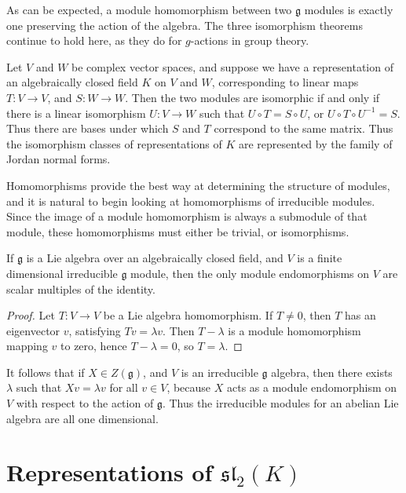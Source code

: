 As can be expected, a module homomorphism between two $\mathfrak{g}$ modules is exactly one preserving the action of the algebra. The three isomorphism theorems continue to hold here, as they do for $g$-actions in group theory.

\begin{example}
    Let $V$ and $W$ be complex vector spaces, and suppose we have a representation of an algebraically closed field $K$ on $V$ and $W$, corresponding to linear maps $T: V \to V$, and $S: W \to W$. Then the two modules are isomorphic if and only if there is a linear isomorphism $U: V \to W$ such that $U \circ T = S \circ U$, or $U \circ T \circ U^{-1} = S$. Thus there are bases under which $S$ and $T$ correspond to the same matrix. Thus the isomorphism classes of representations of $K$ are represented by the family of Jordan normal forms.
\end{example}

Homomorphisms provide the best way at determining the structure of modules, and it is natural to begin looking at homomorphisms of irreducible modules. Since the image of a module homomorphism is always a submodule of that module, these homomorphisms must either be trivial, or isomorphisms.

\begin{lemma}[Schur]
    If $\mathfrak{g}$ is a Lie algebra over an algebraically closed field, and $V$ is a finite dimensional irreducible $\mathfrak{g}$ module, then the only module endomorphisms on $V$ are scalar multiples of the identity.
\end{lemma}
\begin{proof}
    Let $T: V \to V$ be a Lie algebra homomorphism. If $T \neq 0$, then $T$ has an eigenvector $v$, satisfying $Tv = \lambda v$. Then $T - \lambda$ is a module homomorphism mapping $v$ to zero, hence $T - \lambda = 0$, so $T = \lambda$.
\end{proof}

It follows that if $X \in Z(\mathfrak{g})$, and $V$ is an irreducible $\mathfrak{g}$ algebra, then there exists $\lambda$ such that $Xv = \lambda v$ for all $v \in V$, because $X$ acts as a module endomorphism on $V$ with respect to the action of $\mathfrak{g}$. Thus the irreducible modules for an abelian Lie algebra are all one dimensional.

\section{Representations of $\mathfrak{sl}_2(K)$}

